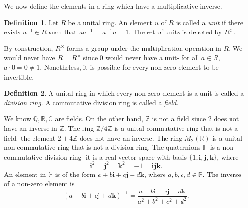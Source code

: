 \documentclass[a4paper, openany]{memoir}
\theoremstyle{definition}
\newtheorem{definition}{Definition}[section]
\theoremstyle{plain}
\begin{document}
We now define the elements in a ring which have a multiplicative inverse.
\begin{definition}
Let $R$ be a unital ring. An element $u$ of $R$ is called a \emph{unit} if there exists $u^{-1} \in R$ such that $uu^{-1} = u^{-1}u = 1$. The set of units is denoted by $R^\times$.
\end{definition}
\noindent By construction, $R^\times$ forms a group under the multiplication operation in $R$. We would never have $R = R^\times$ since $0$ would never have a unit- for all $a \in R$, $a \cdot 0 = 0 \neq 1$. Nonetheless, it is possible for every non-zero element to be invertible.
\begin{definition}
A unital ring in which every non-zero element is a unit is called a \emph{division ring}. A commutative division ring is called a \emph{field}.
\end{definition}
\noindent We know $\mathbb{Q}, \mathbb{R}, \mathbb{C}$ are fields. On the other hand, $\mathbb{Z}$ is not a field since $2$ does not have an inverse in $\mathbb{Z}$. The ring $\mathbb{Z}/4\mathbb{Z}$ is a unital commutative ring that is not a field- the element $2 + 4\mathbb{Z}$ does not have an inverse. The ring $M_2(\mathbb{R})$ is a unital non-commutative ring that is not a division ring. The quaternions $\mathbb{H}$ is a non-commutative division ring- it is a real vector space with basis $\{1, \mathbf{i}, \mathbf{j}, \mathbf{k}\}$, where 
\[\mathbf{i}^2 = \mathbf{j}^2 = \mathbf{k}^2 = -1 = \mathbf{i} \mathbf{j} \mathbf{k}.\]
An element in $\mathbb{H}$ is of the form $a + b\mathbf{i} + c \mathbf{j} + d \mathbf{k}$, where $a, b, c, d \in \mathbb{R}$. The inverse of a non-zero element is
\[(a + b\mathbf{i} + c \mathbf{j} + d \mathbf{k})^{-1} = \frac{a - b\mathbf{i} - c \mathbf{j} - d \mathbf{k}}{a^2 + b^2 + c^2 + d^2}.\]
\newpage
\end{document}
